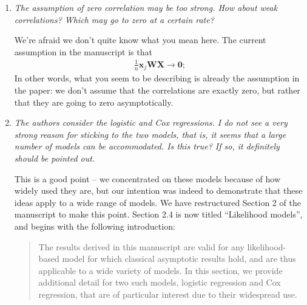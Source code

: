 \documentclass{article}
\begin{document}
\begin{enumerate}

\item {\em The assumption of zero correlation may be too strong. How about weak correlations? Which may go to zero at a certain rate?}

  We're afraid we don't quite know what you mean here.  The current assumption in the manuscript is that
  \begin{align*}
    \frac{1}{n}\mathbf{x}_j\mathbf{W}\mathbf{X} \to \mathbf{0};
  \end{align*}
  In other words, what you seem to be describing is already the assumption in the paper: we don't assume that the correlations are exactly zero, but rather that they are going to zero asymptotically.  

\item {\em The authors consider the logistic and Cox regressions. I do not see a very strong reason for sticking to the two models, that is, it seems that a large number of models can be accommodated. Is this true? If so, it definitely should be pointed out.}

  This is a good point -- we concentrated on these models because of how widely used they are, but our intention was indeed to demonstrate that these ideas apply to a wide range of models.  We have restructured Section 2 of the manuscript to make this point.  Section 2.4 is now titled ``Likelihood models'', and begins with the following introduction:

\begin{quote}
The results derived in this manuscript are valid for any likelihood-based model for which classical asymptotic results hold, and are thus applicable to a wide variety of models.  In this section, we provide additional detail for two such models, logistic regression and Cox regression, that are of particular interest due to their widespread use.
\end{quote}


\end{enumerate}
\end{document}
